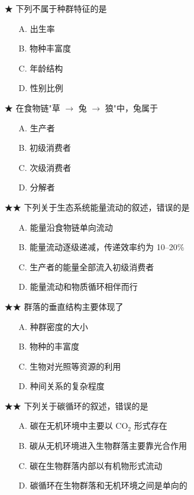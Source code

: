 \begin{enumerate}
  \item[★] 下列不属于种群特征的是
  \begin{enumerate}
    \item[A.] 出生率
    \item[B.] 物种丰富度
    \item[C.] 年龄结构
    \item[D.] 性别比例
  \end{enumerate}
  \vspace{0.8cm}

  \item[★] 在食物链"草 $\to$ 兔 $\to$ 狼"中，兔属于
  \begin{enumerate}
    \item[A.] 生产者
    \item[B.] 初级消费者
    \item[C.] 次级消费者
    \item[D.] 分解者
  \end{enumerate}
  \vspace{0.8cm}

  \item[★★] 下列关于生态系统能量流动的叙述，错误的是
  \begin{enumerate}
    \item[A.] 能量沿食物链单向流动
    \item[B.] 能量流动逐级递减，传递效率约为 10--20\%
    \item[C.] 生产者的能量全部流入初级消费者
    \item[D.] 能量流动和物质循环相伴而行
  \end{enumerate}
  \vspace{0.8cm}

  \item[★★] 群落的垂直结构主要体现了
  \begin{enumerate}
    \item[A.] 种群密度的大小
    \item[B.] 物种的丰富度
    \item[C.] 生物对光照等资源的利用
    \item[D.] 种间关系的复杂程度
  \end{enumerate}
  \vspace{0.8cm}

  \item[★★] 下列关于碳循环的叙述，错误的是
  \begin{enumerate}
    \item[A.] 碳在无机环境中主要以 CO$_2$ 形式存在
    \item[B.] 碳从无机环境进入生物群落主要靠光合作用
    \item[C.] 碳在生物群落内部以有机物形式流动
    \item[D.] 碳循环在生物群落和无机环境之间是单向的
  \end{enumerate}
  \vspace{1cm}
\end{enumerate}

